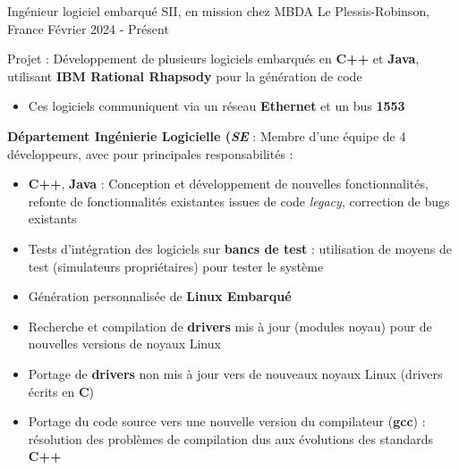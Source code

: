 

\begin{cventries}

	\cventry
	{Ingénieur logiciel embarqué} %
	{SII, en mission chez MBDA} %
	{Le Plessis-Robinson, France} %
	{Février 2024 - Présent} %
	{
		\begin{cvitems} %
		\item{
			Projet : Développement de plusieurs logiciels embarqués en \textbf{C++} et \textbf{Java}, utilisant \textbf{IBM Rational Rhapsody} pour la génération de code
			\begin{itemize}
					\item{Ces logiciels communiquent via un réseau \textbf{Ethernet} et un bus \textbf{1553}}
			\end{itemize}
		}
		\item{
			\textbf{Département Ingénierie Logicielle (\emph{SE}} : Membre d'une équipe de 4 développeurs, avec pour principales responsabilités :
			\begin{itemize}
				\item{\textbf{C++}, \textbf{Java} : Conception et développement de nouvelles fonctionnalités, refonte de fonctionnalités existantes issues de code \emph{legacy}, correction de bugs existants}
				\item{Tests d'intégration des logiciels sur \textbf{bancs de test} : utilisation de moyens de test (simulateurs propriétaires) pour tester le système}
				\item{Génération personnalisée de \textbf{Linux Embarqué}}
				\item{Recherche et compilation de \textbf{drivers} mis à jour (modules noyau) pour de nouvelles versions de noyaux Linux}
				\item{Portage de \textbf{drivers} non mis à jour vers de nouveaux noyaux Linux (drivers écrits en \textbf{C})}
				\item{Portage du code source vers une nouvelle version du compilateur (\textbf{gcc}) : résolution des problèmes de compilation dus aux évolutions des standards \textbf{C++}}
			\end{itemize}
}
\end{cvitems}}
\end{cventries}
